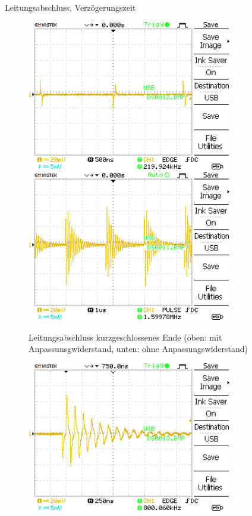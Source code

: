 \documentclass[ngerman]{scrartcl}
\theoremstyle{definition}
\begin{document}
\begin{aufgabe}{Leitungsabschluss, Verzögerungszeit}
			\begin{unteraufgabe}
				\begin{figure}[H]
					\centering
					\includegraphics[width=0.8\textwidth]{MesswerteVersuch1/DS0012.png}
					\includegraphics[width=0.8\textwidth]{MesswerteVersuch1/DS0011.png}
					\caption{Leitungsabschluss kurzgeschlossenes Ende (oben: mit Anpassunsgwiderstand, unten: ohne Anpassungswiderstand)}
					\label{fig:DS000}
				\end{figure}
			\end{unteraufgabe}
\clearpage
			\begin{unteraufgabe}
				\begin{figure}[H]
					\centering
					\includegraphics[width=0.8\textwidth]{MesswerteVersuch1/DS0013.png}	


\end{figure}
\end{unteraufgabe}
\end{aufgabe}
\end{document}
